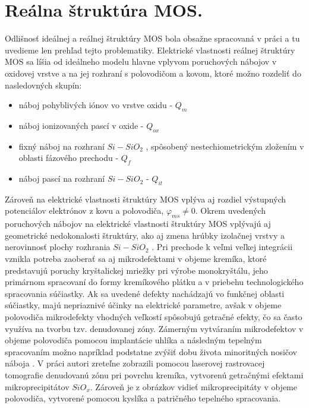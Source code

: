 \section{Reálna štruktúra MOS.}  Odlišnosť ideálnej a reálnej
štruktúry MOS bola obsažne spracovaná v práci \cite{1.12} a tu
uvedieme len prehľad tejto problematiky. Elektrické vlastnosti reálnej
štruktúry MOS sa líšia od ideálneho modelu hlavne vplyvom poruchových
nábojov v oxidovej vrstve a na jej rozhraní s polovodičom a kovom,
ktoré možno rozdeliť do nasledovných skupín:

\begin{itemize}
\item náboj pohyblivých iónov vo vrstve oxidu - $Q_{m}$
\item náboj ionizovaných pascí v oxide - $Q_{ox}$
\item fixný náboj na rozhraní $Si-SiO_2$ , spôsobený nestechiometrickým
  zložením v oblasti fázového prechodu - $Q_f$
\item náboj pascí na rozhraní $Si-SiO_2$  - $Q_{it}$
\end{itemize}

\par Zároveň na elektrické vlastnosti štruktúry MOS vplýva aj rozdiel
výstupných potenciálov elektrónov z kovu a polovodiča,
$\varphi_{ms}\neq{0}$.  Okrem uvedených poruchových nábojov na
elektrické vlastnosti štruktúry MOS vplývajú aj geometrické
nedokonalosti štruktúry, ako aj zmena hrúbky izolačnej vrstvy a
nerovinnosť plochy rozhrania $Si-SiO_2$ . Pri prechode k veľmi veľkej
integrácii vznikla potreba zaoberať sa aj mikrodefektami v objeme
kremíka, ktoré predstavujú poruchy kryštalickej mriežky pri výrobe
monokryštálu, jeho primárnom spracovaní do formy kremíkového plátku a
v priebehu technologického spracovania súčiastky. Ak sa uvedené
defekty nachádzajú vo funkčnej oblasti súčiastky, majú nepriaznivé
účinky na elektrické parametre, avšak v objeme polovodiča mikrodefekty
vhodných veľkostí spôsobujú getračné efekty, čo sa často využíva na
tvorbu tzv. denudovanej zóny.  Zámerným vytváraním mikrodefektov v
objeme polovodiča pomocou implantácie uhlíka a následným tepelným
spracovaním možno napríklad podstatne zvýšiť dobu života minoritných
nosičov náboja \cite{1.13}. V práci \cite{1.14} autori zreteľne
zobrazili pomocou laserovej rastrovacej tomografie denudovanú zónu pri
povrchu kremíka, vytvorenú getračnými efektami mikroprecipitátov
$SiO_x$. Zároveň je z obrázkov vidieť mikroprecipitáty v objeme
polovodiča, vytvorené pomocou kyslíka a patričného tepelného
spracovania.

